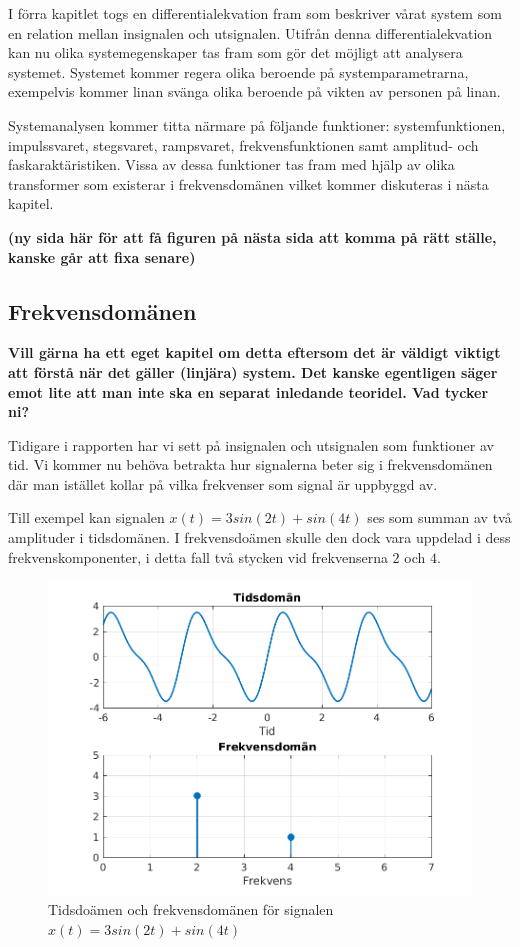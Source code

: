 I förra kapitlet togs en differentialekvation fram som beskriver vårat system som en relation mellan insignalen och utsignalen. Utifrån denna differentialekvation kan nu olika systemegenskaper tas fram som gör det möjligt att analysera systemet. Systemet kommer regera olika beroende på systemparametrarna, exempelvis kommer linan svänga olika beroende på vikten av personen på linan.

Systemanalysen kommer titta närmare på följande funktioner: systemfunktionen, impulssvaret, stegsvaret, rampsvaret, frekvensfunktionen samt amplitud- och faskaraktäristiken.
Vissa av dessa funktioner tas fram med hjälp av olika transformer som existerar i frekvensdomänen vilket kommer diskuteras i nästa kapitel.

\textbf{(ny sida här för att få figuren på nästa sida att komma på rätt ställe, kanske går att fixa senare)}
\newpage
\subsection{Frekvensdomänen}
\textbf{Vill gärna ha ett eget kapitel om detta eftersom det är väldigt viktigt att förstå när det gäller (linjära) system. Det kanske egentligen säger emot lite att man inte ska en separat inledande teoridel. Vad tycker ni?}

Tidigare i rapporten har vi sett på insignalen och utsignalen som funktioner av tid. Vi kommer nu behöva betrakta hur signalerna beter sig i frekvensdomänen där man istället kollar på vilka frekvenser som signal är uppbyggd av.

Till exempel kan signalen $x(t) = 3sin(2t) + sin(4t)$ ses som summan av två amplituder i tidsdomänen. I frekvensdoämen skulle den dock vara uppdelad i dess frekvenskomponenter, i detta fall två stycken vid frekvenserna $2$ och $4$.

\begin{figure}[h] %
    \centering
    \includegraphics{bilder/tid_vs_frekvens_exempel}
    \caption{Tidsdoämen och frekvensdomänen för signalen $x(t)=3sin(2t)+sin(4t)$}
    \label{fig:tid_vs_frekvens_exempel}
\end{figure}

